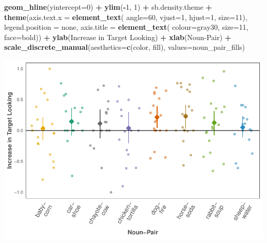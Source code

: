 \documentclass[
  doc,floatsintext]{apa6}
\newenvironment{Shaded}{\begin{snugshade}}{\end{snugshade}}
\newcommand{\AttributeTok}[1]{\textcolor[rgb]{0.13,0.29,0.53}{#1}}
\newcommand{\DecValTok}[1]{\textcolor[rgb]{0.00,0.00,0.81}{#1}}
\newcommand{\FunctionTok}[1]{\textcolor[rgb]{0.13,0.29,0.53}{\textbf{#1}}}
\newcommand{\NormalTok}[1]{#1}
\newcommand{\SpecialCharTok}[1]{\textcolor[rgb]{0.81,0.36,0.00}{\textbf{#1}}}
\newcommand{\StringTok}[1]{\textcolor[rgb]{0.31,0.60,0.02}{#1}}
\begin{document}
\begin{Shaded}
\begin{Highlighting}[]
  \FunctionTok{geom\_hline}\NormalTok{(}\AttributeTok{yintercept=}\DecValTok{0}\NormalTok{) }\SpecialCharTok{+}
  \FunctionTok{ylim}\NormalTok{(}\SpecialCharTok{{-}}\DecValTok{1}\NormalTok{, }\DecValTok{1}\NormalTok{) }\SpecialCharTok{+}
\NormalTok{  sb.density.theme }\SpecialCharTok{+}
  \FunctionTok{theme}\NormalTok{(}\AttributeTok{axis.text.x =} \FunctionTok{element\_text}\NormalTok{(}
    \AttributeTok{angle=}\DecValTok{60}\NormalTok{, }\AttributeTok{vjust=}\DecValTok{1}\NormalTok{, }\AttributeTok{hjust=}\DecValTok{1}\NormalTok{, }\AttributeTok{size=}\DecValTok{11}\NormalTok{),}
        \AttributeTok{legend.position =} \StringTok{\textquotesingle{}none\textquotesingle{}}\NormalTok{,}
        \AttributeTok{axis.title =} \FunctionTok{element\_text}\NormalTok{(}
          \AttributeTok{colour=}\StringTok{\textquotesingle{}gray30\textquotesingle{}}\NormalTok{, }\AttributeTok{size=}\DecValTok{11}\NormalTok{, }\AttributeTok{face=}\StringTok{\textquotesingle{}bold\textquotesingle{}}\NormalTok{)) }\SpecialCharTok{+}
  \FunctionTok{ylab}\NormalTok{(}\StringTok{\textquotesingle{}Increase in Target Looking\textquotesingle{}}\NormalTok{) }\SpecialCharTok{+}
  \FunctionTok{xlab}\NormalTok{(}\StringTok{\textquotesingle{}Noun{-}Pair\textquotesingle{}}\NormalTok{) }\SpecialCharTok{+}
  \FunctionTok{scale\_discrete\_manual}\NormalTok{(}\AttributeTok{aesthetics=}\FunctionTok{c}\NormalTok{(}\StringTok{\textquotesingle{}color\textquotesingle{}}\NormalTok{, }\StringTok{\textquotesingle{}fill\textquotesingle{}}\NormalTok{), }
                        \AttributeTok{values=}\NormalTok{noun\_pair\_fills)}
\end{Highlighting}
\end{Shaded}

\includegraphics{revised_ms_analyses_files/figure-latex/r2-cn-by-item-plots-1.pdf}
\end{document}
